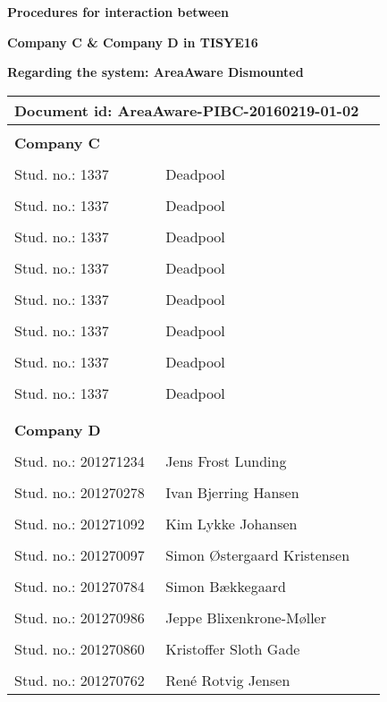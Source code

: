 
\centerline{\Huge\bfseries\color{ThemeColor} Procedures for interaction between} 
\centerline{\Huge\bfseries\color{ThemeColor} Company C \& Company D in TISYE16} 


\vspace{1em}
\centerline{\Large\bfseries\color{BlackColor} Regarding the system: AreaAware Dismounted} 


\begin{center}
   \begin{tabular}{ *{2}l p{6cm} }
   \multicolumn{2}{l}{\textbf{Document id: AreaAware-PIBC-20160219-01-02}} & \\
   \hline
   & & \\
   \textbf{Company C} &  & \\
   & & \\
   Stud. no.: 1337 & Deadpool & \\\hline
   & & \\
   Stud. no.: 1337 & Deadpool & \\\hline
   & & \\
   Stud. no.: 1337 & Deadpool & \\\hline
   & & \\
   Stud. no.: 1337 & Deadpool & \\\hline
   & & \\
   Stud. no.: 1337 & Deadpool & \\\hline
   & & \\
   Stud. no.: 1337 & Deadpool & \\\hline
   & & \\
   Stud. no.: 1337 & Deadpool & \\\hline
   & & \\
   Stud. no.: 1337 & Deadpool & \\\hline
   & & \\
   & & \\
   \textbf{Company D} &  & \\
   & & \\
   Stud. no.: 201271234 & Jens Frost Lunding & \\\hline
   & & \\
   Stud. no.: 201270278 & Ivan Bjerring Hansen & \\\hline
   & & \\
   Stud. no.: 201271092 & Kim Lykke Johansen & \\\hline
   & & \\
   Stud. no.: 201270097 & Simon Østergaard Kristensen & \\\hline
   & & \\
   Stud. no.: 201270784  & Simon Bækkegaard & \\\hline
   & & \\
   Stud. no.: 201270986 & Jeppe Blixenkrone-Møller & \\\hline
   & & \\
   Stud. no.: 201270860 & Kristoffer Sloth Gade & \\\hline
   & & \\
   Stud. no.: 201270762 & René Rotvig Jensen & \\\hline
   \end{tabular}
\end{center}
\thispagestyle{empty} %
\restoregeometry
